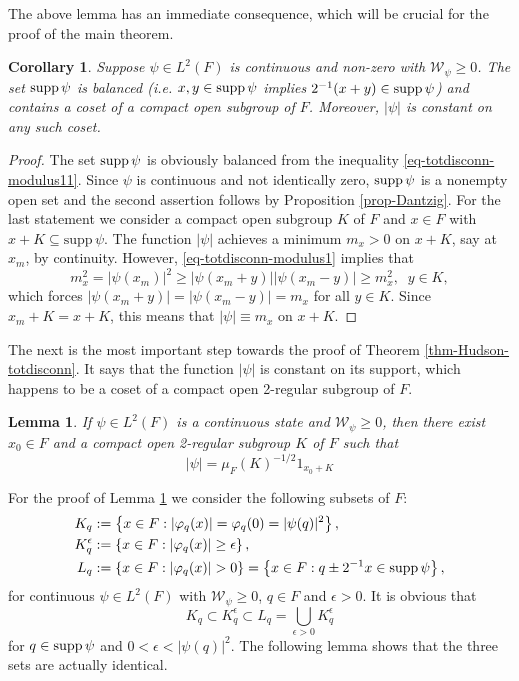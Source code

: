 \documentclass[12pt,reqno]{amsart}
\newtheorem{cor}[thm]{Corollary}
\newtheorem{lem}[thm]{Lemma}
\theoremstyle{definition}
\theoremstyle{definition}
\theoremstyle{definition}
\numberwithin{thm}{section}
\numberwithin{equation}{section}
\newcommand{\set}[1]{\left\{#1\right\}}
\begin{document}
The above lemma has an immediate consequence, which will be crucial for the proof of the main theorem.

\begin{cor} \label{cor-totdisconn-supp}
Suppose $\psi \in L^2(F)$ is continuous and non-zero with $\mathcal{W}_{\psi}\geq 0$.
The set ${\rm supp}\,\psi$ is balanced (i.e. $x,y\in {\rm supp}\,\psi$ implies $2^{-1}(x+y) \in {\rm supp}\,\psi$) and contains a coset of a compact open subgroup of $F$. Moreover, $|\psi|$ is constant on any such coset.
\end{cor}
\begin{proof}
The set ${\rm supp}\,\psi$ is obviously balanced from the inequality \eqref{eq-totdisconn-modulus11}. Since $\psi$ is continuous and not identically zero, ${\rm supp}\,\psi$ is a nonempty open set and the second assertion follows by Proposition \ref{prop-Dantzig}. For the last statement we consider a compact open subgroup $K$ of $F$ and $x\in F$ with $x+K\subseteq\mathrm{supp}\,\psi$. The function $|\psi|$ achieves a minimum $m_x>0$ on $x+K$, say at $x_m$, by continuity. However, \eqref{eq-totdisconn-modulus1} implies that
    $$m_x^2=|\psi(x_m)|^2\geq |\psi(x_m+y)||\psi(x_m-y)|\geq m_x^2,\;\;y\in K,$$
which forces $|\psi(x_m+y)|=|\psi(x_m-y)|=m_x$ for all $y\in K$. Since $x_m+K=x+K$, this means that $|\psi|\equiv m_x$ on $x+K$.
\end{proof}

The next is the most important step towards the proof of Theorem \ref{thm-Hudson-totdisconn}. It says that the function $|\psi|$ is constant on its support, which happens to be a coset of a compact open 2-regular subgroup of $F$.

\begin{lem} \label{lem-totdisconn-Hudson2}
If $\psi \in L^2(F)$ is a continuous state and $\mathcal{W}_{\psi}\geq 0$, then there exist $x_0\in F$ and a compact open 2-regular subgroup $K$ of $F$ such that
\begin{equation}\label{eq-psi}
    |\psi|=\mu_F(K)^{-1/2}1_{x_0+K}
\end{equation}
\end{lem}

For the proof of Lemma \ref{lem-totdisconn-Hudson2} we consider the following subsets of $F$:
\begin{align}\label{eq-def-Lq}
    K_q&:=\set{x\in F: |\varphi_q(x)|=\varphi_q(0)=|\psi(q)|^2}, \nonumber\\
    K_q^{\epsilon}&:=\set{x\in F: |\varphi_q(x)|\geq \epsilon},\nonumber\\
    L_q&:=\set{x\in F: |\varphi_q(x)|>0}=\set{x\in F:q\pm 2^{-1}x\in {\rm supp}\,\psi},
\end{align}
for continuous $\psi \in L^2(F)$ with $\mathcal{W}_{\psi}\geq 0$, $q\in F$ and $\epsilon>0$. It is obvious that
    $$K_q\subset K_q^{\epsilon}\subset L_q=\bigcup_{\epsilon>0}K_q^{\epsilon}$$
for $q\in {\rm supp}\,\psi$ and $0<\epsilon< |\psi(q)|^2$. The following lemma shows that the three sets are actually identical.
\end{document}
